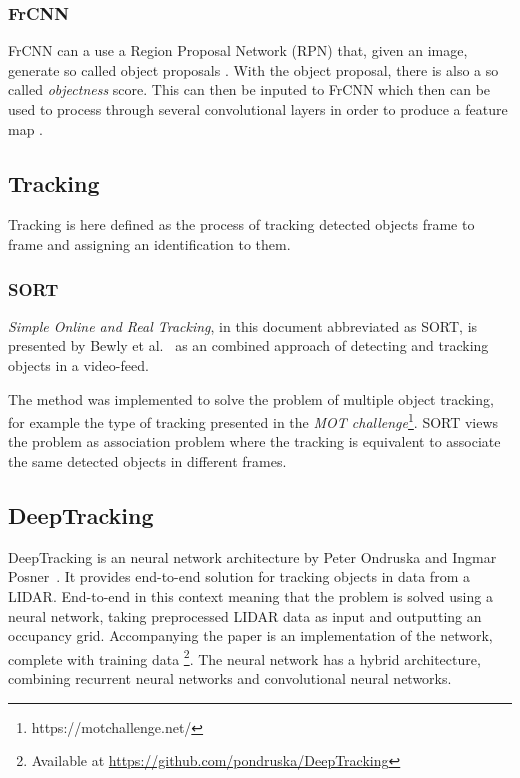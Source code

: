 \documentclass[a4paper]{article}
\begin{document}
\subsubsection{FrCNN}

FrCNN can a use a Region Proposal Network (RPN) that, given an image, generate so called object proposals \cite{NIPS2015_5638}.
With the object proposal, there is also a so called \textit{objectness} score.
This can then be inputed to FrCNN which then can be used to process through several convolutional layers in order to produce a feature map \cite{girshick2015fast}. 

\subsection{Tracking}

Tracking is here defined as the process of tracking detected objects frame to frame and assigning an identification to them.

\subsubsection{SORT}

\emph{Simple Online and Real Tracking}, in this document abbreviated as SORT, is presented by Bewly et al.~\cite{Bewley2016_sort} as an combined approach of detecting and tracking objects in a video-feed.

The method was implemented to solve the problem of multiple object tracking, for example the type of tracking presented in the \emph{MOT challenge}\footnote{https://motchallenge.net/}.
SORT views the problem as association problem where the tracking is equivalent to associate the same detected objects in different frames.

\subsection{DeepTracking}

DeepTracking is an neural network architecture by Peter Ondruska and Ingmar Posner~\cite{DBLP:journals/corr/OndruskaP16}.
It provides end-to-end solution for tracking objects in data from a LIDAR.
End-to-end in this context meaning that the problem is solved using a neural network, taking preprocessed LIDAR data as input and outputting an occupancy grid.
Accompanying the paper is an implementation of the network, complete with training data \footnote{Available at \url{https://github.com/pondruska/DeepTracking}}.
The neural network has a hybrid architecture, combining recurrent neural networks and convolutional neural networks.
\end{document}
